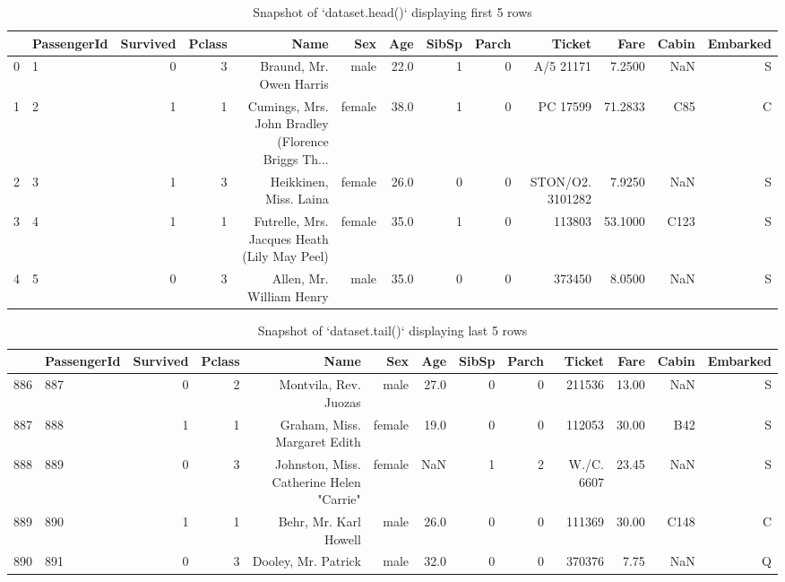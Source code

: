 \documentclass[a4paper, 12pt]{article}
\begin{document}
\begin{table}[ht]
  \centering
  \begin{adjustbox}{width=1\textwidth}
  \begin{tabular}{rlrrrrrrrrrrr}
    \hline
    & \textbf{PassengerId} & \textbf{Survived} & \textbf{Pclass} & \textbf{Name} & \textbf{Sex} & \textbf{Age} & \textbf{SibSp} & \textbf{Parch} & \textbf{Ticket} & \textbf{Fare} & \textbf{Cabin} & \textbf{Embarked} \\
    \hline
    0 & 1 & 0 & 3 & Braund, Mr. Owen Harris & male & 22.0 & 1 & 0 & A/5 21171 & 7.2500 & NaN & S \\
    1 & 2 & 1 & 1 & Cumings, Mrs. John Bradley (Florence Briggs Th... & female & 38.0 & 1 & 0 & PC 17599 & 71.2833 & C85 & C \\
    2 & 3 & 1 & 3 & Heikkinen, Miss. Laina & female & 26.0 & 0 & 0 & STON/O2. 3101282 & 7.9250 & NaN & S \\
    3 & 4 & 1 & 1 & Futrelle, Mrs. Jacques Heath (Lily May Peel) & female & 35.0 & 1 & 0 & 113803 & 53.1000 & C123 & S \\
    4 & 5 & 0 & 3 & Allen, Mr. William Henry & male & 35.0 & 0 & 0 & 373450 & 8.0500 & NaN & S \\
    \hline
  \end{tabular}
  \end{adjustbox}
  \caption{Snapshot of `dataset.head()` displaying first 5 rows } 
\end{table}  
  
\begin{table}[ht]
  \centering
  \begin{adjustbox}{width=1\textwidth}
  \begin{tabular}{rlrrrrrrrrrrr}
    \hline
    & \textbf{PassengerId} & \textbf{Survived} & \textbf{Pclass} & \textbf{Name} & \textbf{Sex} & \textbf{Age} & \textbf{SibSp} & \textbf{Parch} & \textbf{Ticket} & \textbf{Fare} & \textbf{Cabin} & \textbf{Embarked} \\
    \hline
    886 & 887 & 0 & 2 & Montvila, Rev. Juozas & male & 27.0 & 0 & 0 & 211536 & 13.00 & NaN & S \\
    887 & 888 & 1 & 1 & Graham, Miss. Margaret Edith & female & 19.0 & 0 & 0 & 112053 & 30.00 & B42 & S \\
    888 & 889 & 0 & 3 & Johnston, Miss. Catherine Helen "Carrie" & female & NaN & 1 & 2 & W./C. 6607 & 23.45 & NaN & S \\
    889 & 890 & 1 & 1 & Behr, Mr. Karl Howell & male & 26.0 & 0 & 0 & 111369 & 30.00 & C148 & C \\
    890 & 891 & 0 & 3 & Dooley, Mr. Patrick & male & 32.0 & 0 & 0 & 370376 & 7.75 & NaN & Q \\
    \hline
  \end{tabular}
  \end{adjustbox}
  \caption{Snapshot of `dataset.tail()` displaying last 5 rows } 
\end{table} 
\end{document}

